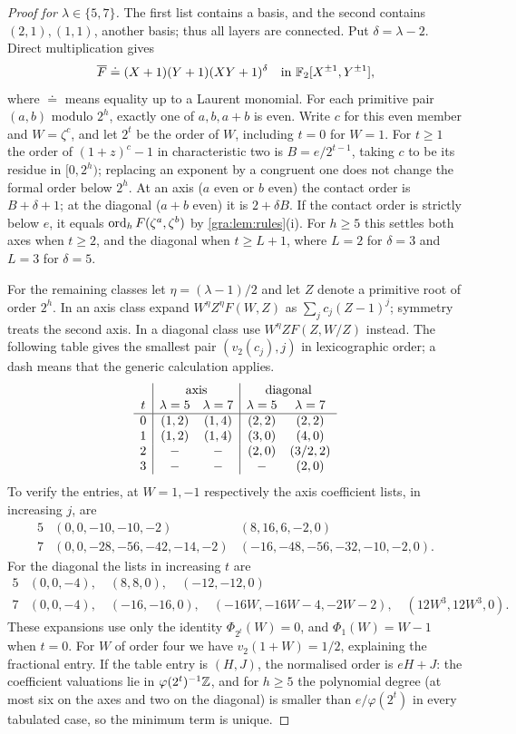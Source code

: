 \begin{proof}[Proof for $\lambda\in\{5,7\}$]
The first list contains a basis, and the second contains $(2,1),(1,1)$,
another basis; thus all layers are connected. Put $\delta=\lambda-2$.
Direct multiplication gives
\[
 \overline F\doteq(X+1)(Y+1)(XY+1)^\delta\quad\text{in }
 \mathbb{F}_2[X^{\pm1},Y^{\pm1}],
\]
where $\doteq$ means equality up to a Laurent monomial. For each primitive
pair $(a,b)$ modulo $2^h$, exactly one of $a,b,a+b$ is even. Write $c$ for
this even member and $W=\zeta^c$, and let $2^t$ be the order of $W$,
including $t=0$ for $W=1$. For $t\ge1$ the order of $(1+z)^c-1$ in
characteristic two is $B=e/2^{t-1}$, taking $c$ to be its residue in
$[0,2^h)$; replacing an exponent by a congruent one does not change the
formal order below $2^h$. At an axis ($a$ even or $b$ even) the contact
order is $B+\delta+1$; at the diagonal ($a+b$ even) it is $2+\delta B$. If
the contact order is strictly below $e$, it equals $\operatorname{ord}_hF(\zeta^a,\zeta^b)$
by \cref{gra:lem:rules}(i). For $h\ge5$ this settles both axes when
$t\ge2$, and the diagonal when $t\ge L+1$, where $L=2$ for $\delta=3$ and
$L=3$ for $\delta=5$.

For the remaining classes let $\eta=(\lambda-1)/2$ and let $Z$ denote a
primitive root of order $2^h$. In an axis class expand
$W^\eta Z^\eta F(W,Z)$ as $\sum_jc_j(Z-1)^j$; symmetry treats the second
axis. In a diagonal class use $W^\eta ZF(Z,W/Z)$ instead. The following
table gives the smallest pair $(v_2(c_j),j)$ in lexicographic order; a dash
means that the generic calculation applies.
\[
\begin{array}{c|cc|cc}
&\multicolumn{2}{c|}{\text{axis}}&\multicolumn{2}{c}{\text{diagonal}}\\
 t&\lambda=5&\lambda=7&\lambda=5&\lambda=7\\\hline
 0&(1,2)&(1,4)&(2,2)&(2,2)\\
 1&(1,2)&(1,4)&(3,0)&(4,0)\\
 2&-&-&(2,0)&(3/2,2)\\
 3&-&-&-&(2,0)
\end{array}
\]
To verify the entries, at $W=1,-1$ respectively the axis coefficient
lists, in increasing $j$, are
\[
\begin{array}{c|ll}
5&(0,0,-10,-10,-2)&(8,16,6,-2,0)\\
7&(0,0,-28,-56,-42,-14,-2)&(-16,-48,-56,-32,-10,-2,0).
\end{array}
\]
For the diagonal the lists in increasing $t$ are
\[
\begin{array}{c|l}
5&(0,0,-4),\quad(8,8,0),\quad(-12,-12,0)\\
7&(0,0,-4),\quad(-16,-16,0),\quad
 (-16W,-16W-4,-2W-2),\quad(12W^3,12W^3,0).
\end{array}
\]
These expansions use only the identity $\Phi_{2^t}(W)=0$, and
$\Phi_1(W)=W-1$ when $t=0$. For $W$ of order four we have
$v_2(1+W)=1/2$, explaining the fractional entry. If the table entry is
$(H,J)$, the normalised order is $eH+J$: the coefficient valuations lie in
$\varphi(2^t)^{-1}\mathbb{Z}$, and for $h\ge5$ the polynomial degree (at most six
on the axes and two on the diagonal) is smaller than $e/\varphi(2^t)$ in
every tabulated case, so the minimum term is unique.


\end{proof}
